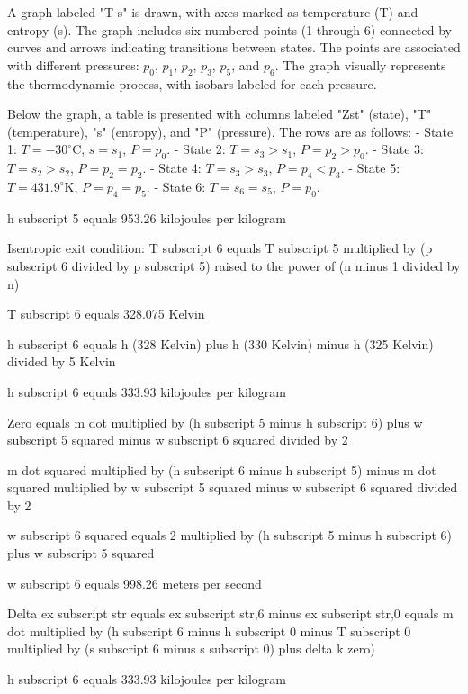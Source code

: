 A graph labeled "T-s" is drawn, with axes marked as temperature (T) and entropy (s). The graph includes six numbered points (1 through 6) connected by curves and arrows indicating transitions between states. The points are associated with different pressures: \( p_0 \), \( p_1 \), \( p_2 \), \( p_3 \), \( p_5 \), and \( p_6 \). The graph visually represents the thermodynamic process, with isobars labeled for each pressure.  

Below the graph, a table is presented with columns labeled "Zst" (state), "T" (temperature), "s" (entropy), and "P" (pressure). The rows are as follows:  
- State 1: \( T = -30^\circ \text{C} \), \( s = s_1 \), \( P = p_0 \).  
- State 2: \( T = s_3 > s_1 \), \( P = p_2 > p_0 \).  
- State 3: \( T = s_2 > s_2 \), \( P = p_2 = p_2 \).  
- State 4: \( T = s_3 > s_3 \), \( P = p_4 < p_3 \).  
- State 5: \( T = 431.9^\circ \text{K} \), \( P = p_4 = p_5 \).  
- State 6: \( T = s_6 = s_5 \), \( P = p_0 \).

h subscript 5 equals 953.26 kilojoules per kilogram  

Isentropic exit condition:  
T subscript 6 equals T subscript 5 multiplied by (p subscript 6 divided by p subscript 5) raised to the power of (n minus 1 divided by n)  

T subscript 6 equals 328.075 Kelvin  

h subscript 6 equals h (328 Kelvin) plus h (330 Kelvin) minus h (325 Kelvin) divided by 5 Kelvin  

h subscript 6 equals 333.93 kilojoules per kilogram  

Zero equals m dot multiplied by (h subscript 5 minus h subscript 6) plus w subscript 5 squared minus w subscript 6 squared divided by 2  

m dot squared multiplied by (h subscript 6 minus h subscript 5) minus m dot squared multiplied by w subscript 5 squared minus w subscript 6 squared divided by 2  

w subscript 6 squared equals 2 multiplied by (h subscript 5 minus h subscript 6) plus w subscript 5 squared  

w subscript 6 equals 998.26 meters per second  

Delta ex subscript str equals ex subscript str,6 minus ex subscript str,0 equals m dot multiplied by (h subscript 6 minus h subscript 0 minus T subscript 0 multiplied by (s subscript 6 minus s subscript 0) plus delta k zero)  

h subscript 6 equals 333.93 kilojoules per kilogram  

